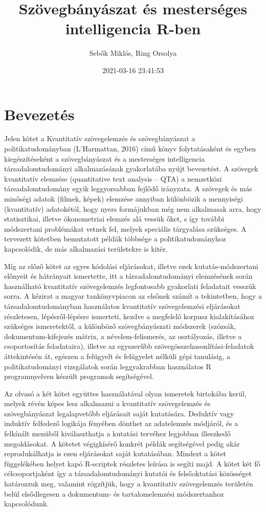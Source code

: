 \documentclass[
]{book}
\title{Szövegbányászat és mesterséges intelligencia R-ben}
\author{Sebők Miklós, Ring Orsolya}
\date{2021-03-16 23:41:53}
\begin{document}
\frontmatter
\maketitle

\mainmatter
\hypertarget{bevezetuxe9s}{%
\chapter{Bevezetés}\label{bevezetuxe9s}}

Jelen kötet a Kvantitatív szövegelemzés és szövegbányászat a
politikatudományban (L'Harmattan, 2016) című könyv folytatásaként és
egyben kiegészítéseként a szövegbányászat és a mesterséges intelligencia
társadalomtudományi alkalmazásának gyakorlatába nyújt bevezetést. A
szövegek kvantitatív elemzése (quantitative text analysis -- QTA) a
nemzetközi társadalomtudomány egyik leggyorsabban fejlődő irányzata. A
szövegek és más minőségi adatok (filmek, képek) elemzése annyiban
különbözik a mennyiségi (kvantitatív) adatokétól, hogy nyers formájukban
még nem alkalmasak arra, hogy statisztikai, illetve ökonometriai elemzés
alá vessük őket, s így további módszertani problémákat vetnek fel,
melyek speciális tárgyalása szükséges. A tervezett kötetben bemutatott
példák többsége a politikatudományhoz kapcsolódik, de más alkalmazási
területekre is kitér.

Míg az előző kötet az egyes kódolási eljárásokat, illetve ezek
kutatás-módszertani előnyeit és hátrányait ismertette, itt a
társadalomtudományi elemzésének során használható kvantitatív
szövegelemzés legfontosabb gyakorlati feladatait vesszük sorra. A
kézirat a magyar tankönyvpiacon az elsőnek számít a tekintetben, hogy a
társadalomtudományban használatos kvantitatív szövegelemzési eljárásokat
részletesen, lépésről-lépésre ismerteti, kezdve a megfelelő korpusz
kialakításához szükséges ismeretektől, a különböző szövegbányászati
módszerek (szózsák, dokumentum-kifejezés mátrix, a névelem-felismerés,
az osztályozás, illetve a csoportosítás feladataira), illetve az
egyszerűbb szövegösszehasonlítási-feladatok áttekintésén át, egészen a
felügyelt és felügyelet nélküli gépi tanulásig, a politikatudományi
vizsgálatok során leggyakrabban használatos R programnyelven készült
programok segítségével.

Az olvasó a két kötet együttes használatával olyan ismeretek birtokába
kerül, melyek révén képes lesz alkalmazni a kvantitatív szövegelemzés és
szövegbányászat legalapvetőbb eljárásait saját kutatására. Deduktív vagy
induktív felfedező logikája fényében dönthet az adatelemzés módjáról, és
a felkínált menüből kiválaszthatja a kutatási tervéhez legjobban
illeszkedő megoldásokat. A kötetet végigkísérő konkrét példák
segítségével pedig akár reprodukálhatja is ezen eljárásokat saját
kutatásában. Mindezt a kötet függelékében helyet kapó R-scriptek
részletes leírása is segíti majd. A kötet két fő célcsoportjaként így a
társadalomtudományi kutatói és felsőoktatási közösséget határozzuk meg,
valamint rögzítjük, hogy a kvantitatív szövegelemzés területén belül
elsődlegesen a dokumentum- és tartalomelemzési módszertanhoz
kapcsolódunk.
\end{document}
